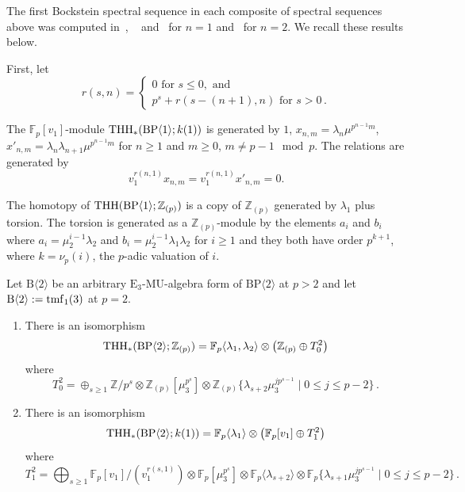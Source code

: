 The first Bockstein spectral sequence in each composite of spectral sequences above was computed in~\cite{MS}, ~\cite{AR} and~\cite{AHL10} for $n=1$ and~\cite{ACH24} for $n=2$. We recall these results below. 

First, let 
\[ 
r(s,n) = \begin{cases} 
0 \text{ for }s\le 0, \text{ and } \\ 
p^{s}+r(s-(n+1),n) \text{ for }s>0\,. 
\end{cases}
\]

\begin{theorem}
The $\mathbb{F}_p[v_1]$-module $\operatorname{THH}_*(\mathrm{BP}\langle 1\rangle; k(1))$ is generated by $1$, $x_{n,m}=\lambda_n\mu^{p^{n-1}m}$, $x'_{n,m}=\lambda_n\lambda_{n+1}\mu^{p^{n-1}m}$ for $n\ge 1$ and $m\ge 0$, $m\ne p-1\mod p$. 
The relations are generated by 
\[ 
v_1^{r(n,1)}x_{n,m}=v_1^{r(n,1)}x'_{n,m}=0.
\]
\end{theorem}

\begin{theorem}
The homotopy of $\operatorname{THH}(\mathrm{BP}\langle 1\rangle;\mathbb{Z}_{(p)})$ is a copy of $\mathbb{Z}_{(p)}$ generated by $\lambda_1$ plus torsion. The torsion is generated as a $\mathbb{Z}_{(p)}$-module by the
elements $a_i$ and $b_i$ where $a_i=\mu_2^{i-1}\lambda_2$ and $b_i=\mu_2^{i-1}\lambda_1\lambda_2$ for $i\ge 1$ and they both have order $p^{k+1}$, where $k= \nu_{p}(i)$, the
$p$-adic valuation of $i$.
\end{theorem}

\begin{theorem}
Let $\mathrm{B}\langle 2\rangle$ be an arbitrary $\mathrm{E}_3$-$\mathrm{MU}$-algebra form of $\mathrm{BP}\langle 2\rangle$ at $p>2$ and let $\mathrm{B}\langle 2\rangle:=\mathrm{tmf}_1(3)$ at $p=2$. 
\begin{enumerate}
\item There is an isomorphism 
\[ 
\operatorname{THH}_*(\mathrm{BP}\langle 2\rangle ;\mathbb{Z}_{(p)})=\mathbb{F}_p\langle \lambda_1 ,\lambda_2\rangle \otimes \left ( \mathbb{Z}_{(p)}\oplus T_0^2 \right )
\]
where 
\[ T_0^2 = \oplus_{s\ge 1} \mathbb{Z}/p^s\otimes \mathbb{Z}_{(p)}[\mu_3^{p^s}]\otimes \mathbb{Z}_{(p)}\{\lambda_{s+2}\mu_3^{jp^{s-1}} \mid 0\le j\le p-2 \} \,. 
\]
\item There is an isomorphism
\[
\operatorname{THH}_*(\mathrm{BP}\langle 2\rangle ;k(1))= \mathbb{F}_p\langle \lambda_1 \rangle \otimes \left ( \mathbb{F}_p[v_1]\oplus T_1^2 \right ) 
\]
where 
\[ 
T_1^2=\bigoplus_{s\ge 1}\mathbb{F}_p[v_1]/(v_1^{r(s,1)})\otimes \mathbb{F}_p[\mu_3^{p^s}]\otimes \mathbb{F}_p\langle \lambda_{s+2}\rangle \otimes \mathbb{F}_p\{ \lambda_{s+1}\mu_3^{jp^{s-1}} \mid 0\le j\le p-2 \} \,.
\]
\end{enumerate}
\end{theorem}

